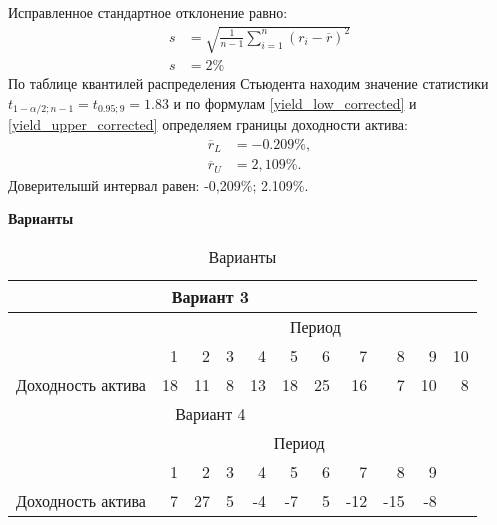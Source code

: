 \documentclass[12pt,a4paper]{article}
\begin{document}
\begin{taskrus}
Исправленное стандартное отклонение равно:
\begin{align}
\label{st_dev_corrected}
s&=\sqrt{\frac{1}{n-1}\sum_{i=1}^n \left(r_i-\overline{r}\right)^2}\\
s&=2\% \nonumber
\end{align}
По  таблице квантилей распределения Стьюдента находим
значение статистики $t_{1-\alpha/2;n-1}=t_{0.95;9}=1.83$ и по формулам \eqref{yield_low_corrected} и \eqref{yield_upper_corrected} определяем границы доходности актива:
\begin{align*}
\overline{r}_L &=-0.209\%,\\
\overline{r}_U &=2,109\%.
\end{align*}
Доверителышй интервал равен: -0,209\%; 2.109\%.

\textbf{Варианты}
\begin{table}[H]
  \centering
  \caption{Варианты}
    \begin{tabular}{lrrrrrrrrrr}
    \toprule
    \multicolumn{9}{c}{Вариант 3}                                             &       &  \\
\midrule
    \multicolumn{1}{c}{\multirow{2}[1]{*}{}} & \multicolumn{10}{c}{Период} \\ \cmidrule{2-11}
    \multicolumn{1}{c}{} & 1     & 2     & 3     & 4     & 5     & 6     & 7     & 8     & 9     & 10 \\
    \multicolumn{1}{l}{Доходность актива} & 18    & 11    & 8     & 13    & 18    & 25    & 16    & 7     & 10    & 8 \\
    \midrule
    \multicolumn{9}{c}{Вариант 4}                                             &       &  \\
\midrule
    \multicolumn{1}{c}{\multirow{2}[1]{*}{}} & \multicolumn{9}{c}{Период}                                            &  \\ \cmidrule{2-10}
    \multicolumn{1}{c}{} & 1     & 2     & 3     & 4     & 5     & 6     & 7     & 8     & 9     &  \\
    \multicolumn{1}{l}{Доходность актива} & 7     & 27    & 5     & -4    & -7    & 5     & -12   & -15   & -8    &  \\
    \bottomrule
    \end{tabular}%
  \label{tab:addlabel}%
\end{table}%


\end{taskrus}
\end{document}
